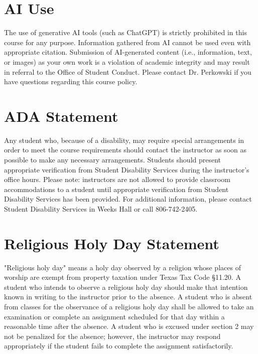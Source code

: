 \documentclass[12pt, notitlepage]{article}   	%
\begin{document}
{\section{AI Use}
The use of generative AI tools (such as ChatGPT) is strictly prohibited in this course for any purpose. Information gathered from AI cannot be used even with appropriate citation. Submission of AI-generated content (i.e., information, text, or images) as your own work is a violation of academic integrity and may result in referral to the Office of Student Conduct. Please contact Dr. Perkowski if you have questions regarding this course policy.

\section{ADA Statement}
Any student who, because of a disability, may require special arrangements in order to meet the course requirements should contact the instructor as soon as possible to make any necessary arrangements. Students should present appropriate verification from Student Disability Services during the instructor’s office hours. Please note: instructors are not allowed to provide classroom accommodations to a student until appropriate verification from Student Disability Services has been provided. For additional information, please contact Student Disability Services in Weeks Hall or call 806-742-2405.

\section{Religious Holy Day Statement}
"Religious holy day" means a holy day observed by a religion whose places of worship are exempt from property taxation under Texas Tax Code §11.20. A student who intends to observe a religious holy day should make that intention known in writing to the instructor prior to the absence. A student who is absent from classes for the observance of a religious holy day shall be allowed to take an examination or complete an assignment scheduled for that day within a reasonable time after the absence. A student who is excused under section 2 may not be penalized for the absence; however, the instructor may respond appropriately if the student fails to complete the assignment satisfactorily.

}
\end{document}
